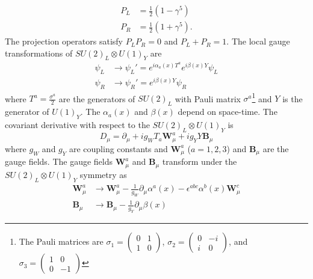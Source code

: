 %
\begin{align}
    P_{L} & = \frac{1}{2} (1 - \gamma^{5})\\
    P_{R} & = \frac{1}{2} (1 + \gamma^{5}).
    \label{eq:sm_projection_operators}
\end{align}
%
The projection operators satisfy $P_{L}P_{R} = 0$ and $P_{L} + P_{R} = 1$.
The local gauge transformations of $SU(2)_{L} \otimes U(1)_{Y}$ are
%
\begin{align}
    \psi_{L} & \rightarrow \psi_{L}' = e^{i \alpha_{a}(x) T^{a}}e^{i \beta(x) Y} \psi_{L}\\
    \psi_{R} & \rightarrow \psi_{R}' = e^{i \beta(x) Y} \psi_{R}
    \label{eq:sm_local_gauge_transformations_ew_1}
\end{align}
%
where $T^{a} = \frac{\sigma^{a}}{2}$ are the generators of $SU(2)_{L}$ with Pauli matrix $\sigma^{a}$\footnote{The Pauli matrices are $\sigma_{1}=\left(\begin{matrix}0 & 1\\1 & 0\end{matrix}\right)$, $\sigma_{2}=\left(\begin{matrix}0 & -i\\i & 0\end{matrix}\right)$, and $\sigma_{3}=\left(\begin{matrix}1 & 0\\0 & -1\end{matrix}\right)$} and $Y$ is the generator of $U(1)_{Y}$.
The $\alpha_{a}(x)$ and $\beta(x)$ depend on space-time.
The covariant derivative with respect to the $SU(2)_{L} \otimes U(1)_{Y}$ is
%
\begin{equation}
    D_{\mu} = \partial_{\mu} + i g_{W} T_{a} \bm{W}_{\mu}^{a} + i g_{Y} Y \bm{B}_{\mu}
    \label{eq:sm_derivative_ew}
\end{equation}
%
where $g_{W}$ and $g_{Y}$ are coupling constants and $\bm{W}_{\mu}^{a}$ ($a = 1, 2, 3$) and $\bm{B}_{\mu}$ are the gauge fields.
The gauge fields $\bm{W}_{\mu}^{a}$ and $\bm{B}_{\mu}$ transform under the $SU(2)_{L} \otimes U(1)_{Y}$ symmetry as
%
\begin{align}
    \bm{W}_{\mu}^{a} & \rightarrow \bm{W}_{\mu}^{a} - \frac{1}{g_{W}} \partial_{\mu} \alpha^{a}(x) - \epsilon^{abc} \alpha^{b}(x) \bm{W}_{\mu}^{c}\\
    \bm{B}_{\mu} & \rightarrow \bm{B}_{\mu} - \frac{1}{g_{Y}} \partial_{\mu} \beta(x)
    \label{eq:sm_local_gauge_transformations_ew_2}
\end{align}
